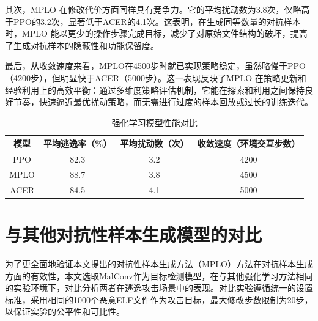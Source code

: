其次，MPLO 在修改代价方面同样具有竞争力。它的平均扰动数为3.8次，仅略高于PPO的3.2次，显著低于ACER的4.1次。这表明，在生成同等数量的对抗样本时，MPLO 能以更少的操作步骤完成目标，减少了对原始文件结构的破坏，提高了生成对抗样本的隐蔽性和功能保留度。


最后，从收敛速度来看，MPLO在4500步时就已实现策略稳定，虽然略慢于PPO（4200步），但明显快于ACER（5000步）。这一表现反映了MPLO 在策略更新和经验利用上的高效平衡：通过多维度策略评估机制，它能在探索和利用之间保持良好节奏，快速逼近最优扰动策略，而无需进行过度的样本回放或过长的训练迭代。


\begin{table}[htbp]
	\centering
	\caption{强化学习模型性能对比}
	\label{tab:5.9}
	\begin{tabular*}{0.9\textwidth}{@{\extracolsep{\fill}}cccc}
		\toprule
		模型 & 平均逃逸率（\%） & 平均扰动数（次） & 收敛速度（环境交互步数） \\
		\midrule
		PPO & 82.3 & 3.2 & 4200 \\
		MPLO & 88.7 & 3.8 & 4500 \\
		ACER & 84.5 & 4.1 & 5000 \\
		\bottomrule
	\end{tabular*}
\end{table}

\section{与其他对抗性样本生成模型的对比}

为了更全面地验证本文提出的对抗性样本生成方法（MPLO）方法在对抗样本生成方面的有效性，本文选取MalConv\cite{raff2017malware}作为目标检测模型，在与其他强化学习方法相同的实验环境下，对比分析两者在逃逸攻击场景中的表现。对比实验遵循统一的设置标准，采用相同的1000个恶意ELF文件作为攻击目标，最大修改步数限制为20步，以保证实验的公平性和可比性。

